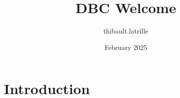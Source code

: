 \documentclass{article}
\title{DBC Welcome}
\author{thibault.latrille }
\date{February 2025}
\begin{document}
\maketitle

\section{Introduction}
\end{document}
